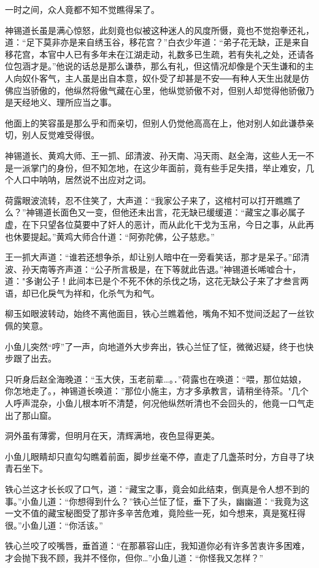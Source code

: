 \documentclass[12pt,oneside]{book}
\begin{document}
一时之间，众人竟都不知不觉瞧得呆了。

神锡道长虽是满心惊怒，此刻竟也似被这种迷人的风度所慑，竟也不觉抱拳还礼，道：``足下莫非亦是来自绣玉谷，移花宫？''白衣少年道：``弟子花无缺，正是来自移花宫，本官中人已有多年未在江湖走动，礼数多已生疏，若有失礼之处，还请各位包涵才是。''他说的话总是那么谦恭，那么有礼，但这情况却像是个天生谦和的主人向奴仆客气，主人虽是出自本意，奴仆受了却甚是不安──有种人天生出就是仿佛应当骄傲的，他纵然将傲气藏在心里，他纵觉骄傲不对，但别人却觉得他骄傲乃是天经地义、理所应当之事。

他面上的笑容虽是那么乎和而亲切，但别人仍觉他高高在上，他对别人如此谦恭亲切，别人反觉难受得很。

神锡道长、黄鸡大师、王一抓、邱清波、孙天南、冯天雨、赵全海，这些人无一不是一派掌门的身份，但不知怎地，在这少年面前，竟有些手足失措，举止难安，几个人口中呐呐，居然说不出应对之词。

荷露眼波流转，忍不住笑了，大声道：``我家公子来了，这棺村可以打开瞧瞧了么？''神锡道长面色又一变，但他还未出言，花无缺已缓缓道：``藏宝之事必属子虚，在下只望各位莫要中了奸人的恶计，而从此化干戈为玉帛，今日之事，从此再也休要提起。''黄鸡大师合什道：``阿弥陀佛，公子慈悲。''

王一抓大声道：``谁若还想争杀，却让别人暗中在一旁看笑话，那才是呆子。''邱清波、孙天南等齐声道：``公子所言极是，在下等就此告退。''神锡道长唏嘘合十，道："多谢公子！此间本已是个不死不休的杀伐之场，这花无缺公子来了才叁言两语，却已化戾气为祥和，化杀气为和气。

柳玉如眼波转动，始终不离他面目，铁心兰瞧着他，嘴角不知不觉间泛起了一丝钦佩的笑意。

小鱼儿突然``哼''了一声，向地道外大步奔出，铁心兰怔了怔，微微迟疑，终于也快步跟了出去。

只听身后赵全海晚道：``玉大侠，玉老前辈\ldots。．''荷露也在唤道：``喂，那位姑娘，你怎地走了。，神锡道长唤道：''那位小施主，方才多承教言，请稍坐待茶。"几个人呼声混杂，小鱼儿根本听不清楚，何况他纵然听清也不会回头的，他竟一口气走出了那山窟。

洞外虽有薄雾，但明月在天，清辉满地，夜色显得更美。

小鱼儿眼睛却只直勾勾瞧着前面，脚步丝毫不停，直走了几盏茶时分，方自寻了块青石坐下。

铁心兰这才长长叹了口气，道：``藏宝之事，竟会如此结束，倒真是令人想不到的事。''小鱼儿道：``你想得到什么？''铁心兰怔了怔，垂下了头，幽幽道：``我竟为这一文不值的藏宝秘图受了那许多辛苦危难，竟险些一死，如今想来，真是冤枉得很。''小鱼儿道：``你活该。''

铁心兰咬了咬嘴唇，垂首道：``在那慕容山庄，我知道你必有许多苦衷许多困难，才会抛下我不顾，我并不怪你，但你\ldots{}''小鱼儿道：``你怪我又怎样？''
\end{document}
